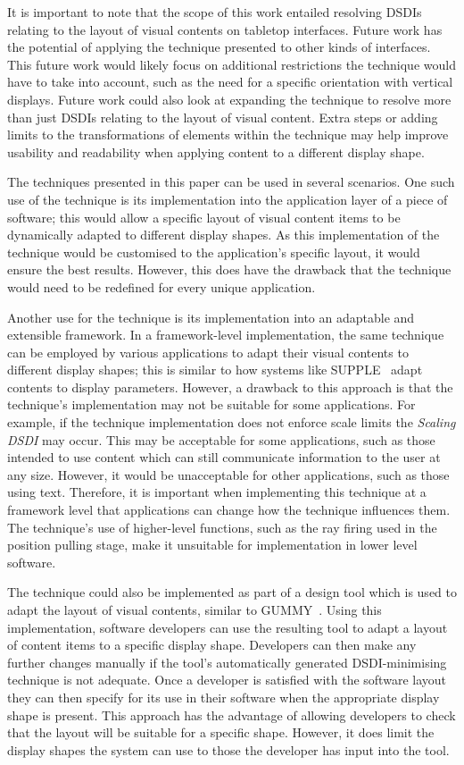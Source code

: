 \documentclass{bmcart}
\begin{document}
It is important to note that the scope of this work entailed resolving \acp{DSDI} relating to the layout of visual contents on tabletop interfaces.
Future work has the potential of applying the technique presented to other kinds of interfaces.
This future work would likely focus on additional restrictions the technique would have to take into account, such as the need for a specific orientation with vertical displays.
Future work could also look at expanding the technique to resolve more than just \acp{DSDI} relating to the layout of visual content.
Extra steps or adding limits to the transformations of elements within the technique may help improve usability and readability when applying content to a different display shape.

The techniques presented in this paper can be used in several scenarios.
One such use of the technique is its implementation into the application layer of a piece of software; this would allow a specific layout of visual content items to be dynamically adapted to different display shapes.
As this implementation of the technique would be customised to the application's specific layout, it would ensure the best results.
However, this does have the drawback that the technique would need to be redefined for every unique application.

Another use for the technique is its implementation into an adaptable and extensible framework.
In a framework-level implementation, the same technique can be
employed by various applications to adapt their visual contents to different display shapes; this is similar to how systems like SUPPLE~\cite{Gajos2004} adapt contents to display parameters.
However, a drawback to this approach is that the technique's implementation may not be suitable for some applications.  
For example, if the technique implementation does not enforce scale limits the {\emph{Scaling \ac{DSDI}}} may occur.
This may be acceptable for some applications, such as those intended to use content which can still communicate information to the user at any size.
However, it would be unacceptable for other applications, such as those using text.
Therefore, it is important when implementing this technique at a framework level that applications can change how the technique influences them.
The technique's use of higher-level functions, such as the ray firing used in the position pulling stage, make it unsuitable for implementation in lower level software.

The technique could also be implemented as part of a design tool which is used to adapt the layout of visual contents, similar to GUMMY~\cite{Meskens2008}.
Using this implementation, software developers can use the resulting tool to adapt a layout of content items to a specific display shape.
Developers can then make any further changes manually if the tool's automatically generated \ac{DSDI}-minimising technique is not adequate.
Once a developer is satisfied with the software layout they can then specify for its use in their software when the appropriate display shape is present.
This approach has the advantage of allowing developers to check that the layout will be suitable for a specific shape.
However, it does limit the display shapes the system can use to those the developer has input into the tool.
\end{document}

